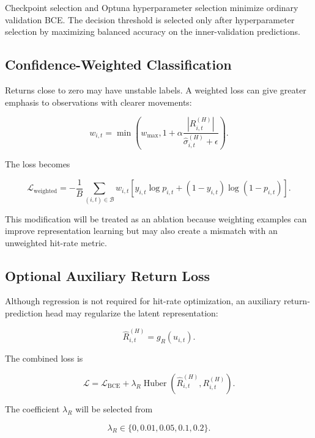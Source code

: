 \documentclass[11pt]{article}
\newcommand{\BCE}{\mathcal{L}_{\mathrm{BCE}}}
\begin{document}
Checkpoint selection and Optuna hyperparameter selection minimize ordinary
validation BCE. The decision threshold is selected only after hyperparameter
selection by maximizing balanced accuracy on the inner-validation predictions.

\subsection{Confidence-Weighted Classification}

Returns close to zero may have unstable labels. A weighted loss can give
greater emphasis to observations with clearer movements:

\begin{equation}
w_{i,t}
=
\min
\left(
w_{\max},
1+
\alpha
\frac{
|R_{i,t}^{(H)}|
}{
\widehat \sigma_{i,t}^{(H)}+\epsilon
}
\right).
\end{equation}

The loss becomes

\begin{equation}
\mathcal{L}_{\mathrm{weighted}}
=
-
\frac{1}{B}
\sum_{(i,t)\in\mathcal B}
w_{i,t}
\left[
y_{i,t}\log p_{i,t}
+
(1-y_{i,t})\log(1-p_{i,t})
\right].
\end{equation}

This modification will be treated as an ablation because weighting examples
can improve representation learning but may also create a mismatch with an
unweighted hit-rate metric.

\subsection{Optional Auxiliary Return Loss}

Although regression is not required for hit-rate optimization, an auxiliary
return-prediction head may regularize the latent representation:

\begin{equation}
\widehat R_{i,t}^{(H)}
=
g_R(u_{i,t}).
\end{equation}

The combined loss is

\begin{equation}
\mathcal{L}
=
\BCE
+
\lambda_R
\operatorname{Huber}
\left(
\widehat R_{i,t}^{(H)},
R_{i,t}^{(H)}
\right).
\end{equation}

The coefficient $\lambda_R$ will be selected from

\begin{equation}
\lambda_R
\in
\{0,0.01,0.05,0.1,0.2\}.
\end{equation}
\end{document}
